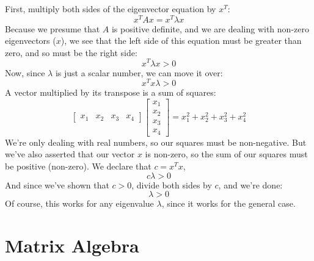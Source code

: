 \documentclass[11pt]{report}
\begin{document}
First, multiply both sides of the eigenvector equation by $x^T$:
\[ x^TAx = x^T\lambda x \]
Because we presume that $A$ is positive definite, and we are dealing with non-zero eigenvectors ($x$), we see that the left side of this equation must be greater than zero, and so must be the right side:
\[ x^T\lambda x > 0 \]
Now, since $\lambda$ is just a scalar number, we can move it over:
\[ x^Tx\lambda > 0 \]
A vector multiplied by its transpose is a sum of squares:
\[
  \begin{bmatrix}
    x_1 & x_2 & x_3 & x_4
  \end{bmatrix}
  \begin{bmatrix}
    x_1 \\ x_2 \\ x_3 \\ x_4
  \end{bmatrix}
  =
  x_1^2 + x_2^2 + x_3^2 + x_4^2
\]
We're only dealing with real numbers, so our squares must be non-negative. But we've also asserted that our vector $x$ is non-zero, so the sum of our squares must be positive (non-zero). We declare that $c = x^Tx$,
\[ c\lambda > 0 \]
And since we've shown that $c > 0$, divide both sides by $c$, and we're done:
\[ \lambda > 0 \]
Of course, this works for any eigenvalue $\lambda$, since it works for the general case.


\section{Matrix Algebra}
\end{document}
